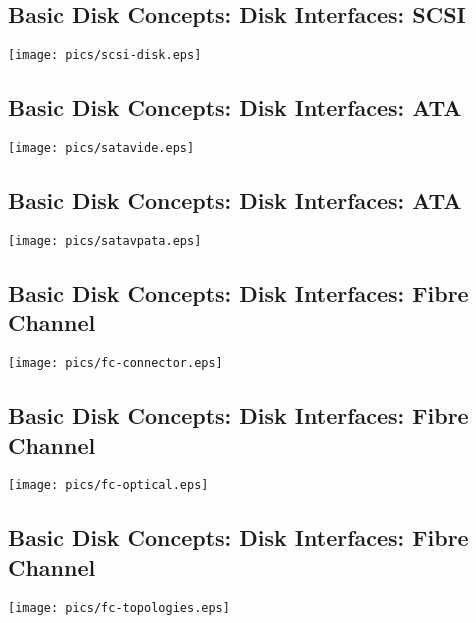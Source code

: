 \documentclass[xga]{xdvislides}
\begin{document}
\subsection{Basic Disk Concepts: Disk Interfaces: SCSI}
\vfill
	\begin{center}
		\texttt{[image: pics/scsi-disk.eps]} \\
	\end{center}
\vfill

\subsection{Basic Disk Concepts: Disk Interfaces: ATA}
\vfill
	\begin{center}
		\texttt{[image: pics/satavide.eps]} \\
	\end{center}
\vfill

\subsection{Basic Disk Concepts: Disk Interfaces: ATA}
\vfill
	\begin{center}
		\texttt{[image: pics/satavpata.eps]} \\
	\end{center}
\vfill



\subsection{Basic Disk Concepts: Disk Interfaces: Fibre Channel}
\vfill
	\begin{center}
		\texttt{[image: pics/fc-connector.eps]} \\
	\end{center}
\vfill

\subsection{Basic Disk Concepts: Disk Interfaces: Fibre Channel}
\vfill
	\begin{center}
		\texttt{[image: pics/fc-optical.eps]} \\
	\end{center}
\vfill

\subsection{Basic Disk Concepts: Disk Interfaces: Fibre Channel}
\vfill
	\begin{center}
		\texttt{[image: pics/fc-topologies.eps]} \\
	\end{center}
\vfill
\end{document}
